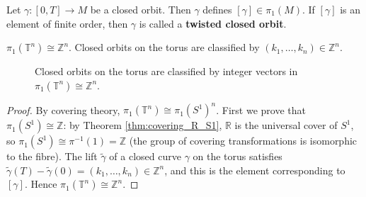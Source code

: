 \begin{definition}\label{def:closed_orbit_manifold}
Let $\gamma: [0,T] \to M$ be a closed orbit. Then $\gamma$ defines $[\gamma] \in \pi_1(M)$. If $[\gamma]$ is an element of finite order, then $\gamma$ is called a \textbf{twisted closed orbit}.
\end{definition}

\begin{proposition}\label{prop:periodic_manifold_fundamental_group}
$\pi_1(\mathbb{T}^n) \cong \mathbb{Z}^n$. Closed orbits on the torus are classified by $(k_1, \dots, k_n) \in \mathbb{Z}^n$.
\end{proposition}

\begin{figure}[htbp]
\centering
{}
\caption{Closed orbits on the torus are classified by integer vectors in $\pi_1(\mathbb{T}^n)\cong\mathbb{Z}^n$.}
\label{fig:torus_fundamental_group}
\end{figure}

\begin{proof}
By covering theory, $\pi_1(\mathbb{T}^n) \cong \pi_1(S^1)^n$. First we prove that $\pi_1(S^1) \cong \mathbb{Z}$: by Theorem \ref{thm:covering_R_S1}, $\mathbb{R}$ is the universal cover of $S^1$, so $\pi_1(S^1) \cong \pi^{-1}(1) = \mathbb{Z}$ (the group of covering transformations is isomorphic to the fibre). The lift $\tilde{\gamma}$ of a closed curve $\gamma$ on the torus satisfies $\tilde{\gamma}(T) - \tilde{\gamma}(0) = (k_1, \dots, k_n) \in \mathbb{Z}^n$, and this is the element corresponding to $[\gamma]$. Hence $\pi_1(\mathbb{T}^n) \cong \mathbb{Z}^n$.
\end{proof}

